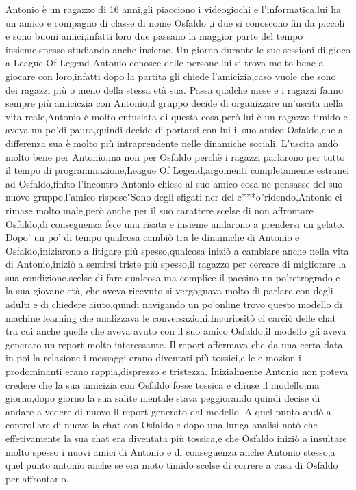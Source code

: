 \documentclass{article}
\begin{document}
Antonio è un ragazzo di 16 anni,gli piacciono i videogiochi e l'informatica,lui ha un amico e compagno di classe di nome Osfaldo ,i due si conoscono fin da piccoli e sono buoni amici,infatti loro due passano la maggior parte del tempo insieme,spesso studiando anche insieme.
Un giorno durante le sue sessioni di gioco a League Of Legend Antonio conosce delle persone,lui si trova molto bene a giocare con loro,infatti dopo la partita gli chiede l'amicizia,caso vuole che sono dei ragazzi più o meno della stessa età sua.
Passa qualche mese e i ragazzi fanno sempre più amiciczia con Antonio,il gruppo decide di organizzare un'uscita nella vita reale,Antonio è molto entusiata di questa cosa,però lui è un ragazzo timido e aveva un po'di paura,quindi decide di portarsi con lui il suo amico Osfaldo,che a differenza sua è molto più intraprendente nelle dinamiche sociali.
L'uscita andò molto bene per Antonio,ma non per Osfaldo perchè i ragazzi parlarono per tutto il tempo di programmazione,League Of Legend,argomenti completamente estranei ad Osfaldo,finito l'incontro Antonio chiese al suo amico cosa ne pensasse del suo nuovo gruppo,l'amico rispose"Sono degli sfigati ner del c***o"ridendo,Antonio ci rimase molto male,però anche per il suo carattere scelse di non affrontare Osfaldo,di conseguenza fece una risata e insieme andarono a prendersi un gelato.
Dopo' un po' di tempo qualcosa cambiò tra le dinamiche di Antonio e Osfaldo,iniziarono a litigare più spesso,qualcosa iniziò a cambiare anche nella vita di Antonio,iniziò a sentirsi triste più spesso,il ragazzo per cercare di migliorare la sua condizione,scelse di fare qualcosa ma complice il paesino un po'retrogrado e la sua giovane età, che aveva ricevuto si vergognava molto di parlare con degli adulti e di chiedere aiuto,quindi navigando un po'online trovo questo modello di machine learning che analizzava le conversazioni.Incuriositò ci carciò delle chat tra cui anche quelle che aveva avuto con il suo amico Osfaldo,il modello gli aveva generaro un report molto interessante.
Il report affermava che da una certa data in poi la relazione i messaggi erano diventati più tossici,e le e mozion i prodominanti erano rappia,disprezzo e tristezza.
Inizialmente Antonio non poteva credere che la sua amicizia con Osfaldo fosse tossica e chiuse il modello,ma giorno,dopo giorno la sua salite mentale stava peggiorando quindi decise di andare a vedere di nuovo il report generato dal modello.
A quel punto andò a controllare di nuovo la chat con Osfaldo e dopo una lunga analisi notò che effetivamente la sua chat era diventata più tossica,e che Osfaldo iniziò a insultare molto spesso i nuovi amici di Antonio e di conseguenza anche Antonio stesso,a quel punto antonio anche se era moto timido scelse di correre a casa di Osfaldo per affrontarlo.
\end{document}
